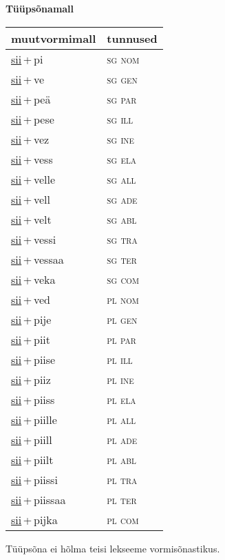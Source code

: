 
\vspace{1.8em}
\begin{minipage}{\textwidth}
\textbf{Tüüpsõnamall \,}\\

\begin{sideways}
\begin{tabular}{l l}
muutvormimall & tunnused \\
\hline
\underline{sii}\,+\,pi & \textsc{ sg nom } \\
\underline{sii}\,+\,ve & \textsc{ sg gen } \\
\underline{sii}\,+\,peä & \textsc{ sg par } \\
\underline{sii}\,+\,pese & \textsc{ sg ill } \\
\underline{sii}\,+\,vez & \textsc{ sg ine } \\
\underline{sii}\,+\,vess & \textsc{ sg ela } \\
\underline{sii}\,+\,velle & \textsc{ sg all } \\
\underline{sii}\,+\,vell & \textsc{ sg ade } \\
\underline{sii}\,+\,velt & \textsc{ sg abl } \\
\underline{sii}\,+\,vessi & \textsc{ sg tra } \\
\underline{sii}\,+\,vessaa & \textsc{ sg ter } \\
\underline{sii}\,+\,veka & \textsc{ sg com } \\
\underline{sii}\,+\,ved & \textsc{ pl nom } \\
\underline{sii}\,+\,pije & \textsc{ pl gen } \\
\underline{sii}\,+\,piit & \textsc{ pl par } \\
\underline{sii}\,+\,piise & \textsc{ pl ill } \\
\underline{sii}\,+\,piiz & \textsc{ pl ine } \\
\underline{sii}\,+\,piiss & \textsc{ pl ela } \\
\underline{sii}\,+\,piille & \textsc{ pl all } \\
\underline{sii}\,+\,piill & \textsc{ pl ade } \\
\underline{sii}\,+\,piilt & \textsc{ pl abl } \\
\underline{sii}\,+\,piissi & \textsc{ pl tra } \\
\underline{sii}\,+\,piissaa & \textsc{ pl ter } \\
\underline{sii}\,+\,pijka & \textsc{ pl com } \\
\end{tabular}
\end{sideways}
\label{tab:tüüpsõnamall-siipi}

\end{minipage}

 
\vspace{1em}
\noindent Tüüpsõna ei hõlma teisi lekseeme vormi\-sõnastikus.
